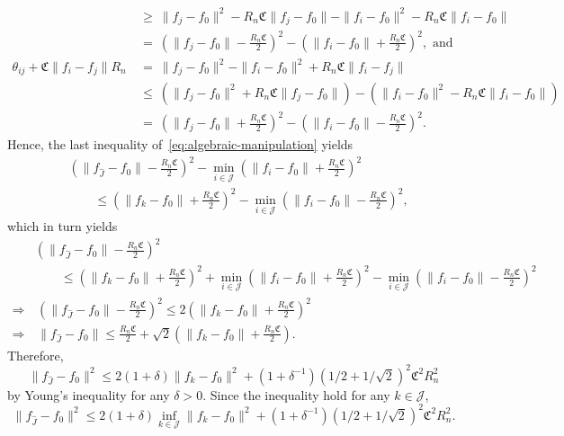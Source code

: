 \documentclass[12pt]{article}
\begin{document}
\begin{appendices}
\begin{align*}
    ~&\geq~ \| f_j - f_0 \|^2 - R_n \mathfrak{C} \| f_j - f_0 \| - \| f_i - f_0 \|^2 - R_n \mathfrak{C} \| f_i - f_0 \| \\
    ~&=~ \left( \| f_j - f_0 \| - \frac{R_n \mathfrak{C}}{2} \right)^2 - \left( \| f_i - f_0 \| + \frac{R_n \mathfrak{C}}{2} \right)^2, \text{ and}\\
    \theta_{i j} + \mathfrak{C}\|f_i - f_j\| R_n ~&=~ \| f_j - f_0 \|^2 - \| f_i - f_0 \|^2 + R_n \mathfrak{C} \| f_i - f_j \| \\
    ~&\leq~ \left( \| f_j - f_0 \|^2 + R_n \mathfrak{C} \| f_j - f_0 \| \right) - \left( \| f_i - f_0 \|^2 - R_n \mathfrak{C} \| f_i - f_0 \| \right) \\
    ~&=~ \left( \| f_j - f_0 \| + \frac{R_n \mathfrak{C}}{2} \right)^2 - \left( \| f_i - f_0 \| - \frac{R_n \mathfrak{C}}{2} \right)^2.
\end{align*}
Hence, the last inequality of~\eqref{eq:algebraic-manipulation} yields
\begin{align*}
    &\left( \| f_{\widehat{J}} - f_0 \| - \frac{R_n \mathfrak{C}}{2} \right)^2 - \min_{i\in \mathcal{J}}\left( \| f_i - f_0 \| + \frac{R_n \mathfrak{C}}{2} \right)^2 \\
    &\qquad \le \left( \| f_{k} - f_0 \| + \frac{R_n \mathfrak{C}}{2} \right)^2 - \min_{i\in \mathcal{J}}\left( \| f_i - f_0 \| - \frac{R_n \mathfrak{C}}{2} \right)^2,
\end{align*}
which in turn yields
\begin{align*}
    &\left( \| f_{\widehat{J}} - f_0 \| - \frac{R_n \mathfrak{C}}{2} \right)^2 \\
    &\qquad \le \left( \| f_{k} - f_0 \| + \frac{R_n \mathfrak{C}}{2} \right)^2 + \min_{i\in \mathcal{J}}\left( \| f_i - f_0 \| + \frac{R_n \mathfrak{C}}{2} \right)^2 -\min_{i\in \mathcal{J}}\left( \| f_i - f_0 \| - \frac{R_n \mathfrak{C}}{2} \right)^2 \\
    \Rightarrow &\,\left( \| f_{\widehat{J}} - f_0 \| - \frac{R_n \mathfrak{C}}{2} \right)^2 \le 2\left( \| f_{k} - f_0 \| + \frac{R_n \mathfrak{C}}{2} \right)^2  \\
    \Rightarrow &\, \|f_{\widehat{J}} - f_0\| \le \frac{R_n\mathfrak{C}}{2} + \sqrt{2}\left(\|f_{k} - f_0\| + \frac{R_n\mathfrak{C}}{2}\right).
\end{align*}
Therefore, 
\[
\|f_{\widehat{J}} - f_0\|^2 \le 2(1 + \delta)\|f_{k} - f_0\|^2 + (1+\delta^{-1})(1/2 + 1/\sqrt{2})^2\mathfrak{C}^2R_n^2
\]
by Young's inequality for any $\delta > 0$. Since the inequality hold for any $k \in \mathcal{J}$, 
\[
\|f_{\widehat{J}} - f_0\|^2 \le 2(1 + \delta)\inf_{k\in\mathcal{J}}\|f_{k} - f_0\|^2 + (1+\delta^{-1})(1/2 + 1/\sqrt{2})^2\mathfrak{C}^2R_n^2.
\]


\end{appendices}
\end{document}
